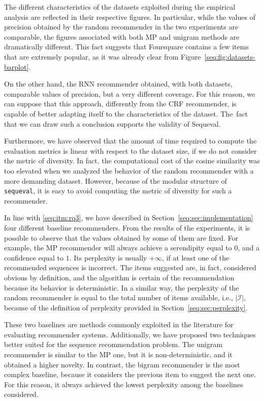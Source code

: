 The different characteristics of the datasets exploited during the empirical analysis are reflected in their respective figures. In particular, while the values of precision obtained by the random recommender in the two experiments are comparable, the figures associated with both MP and unigram methods are dramatically different. This fact suggests that Foursquare contains a few items that are extremely popular, as it was already clear from Figure~\ref{seq:fig:datasets-barplot}.

On the other hand, the RNN recommender obtained, with both datasets, comparable values of precision, but a very different coverage. For this reason, we can suppose that this approach, differently from the CRF recommender, is capable of better adapting itself to the characteristics of the dataset. The~fact that we can draw such {a }conclusion supports the validity of Sequeval.

Furthermore, we have observed that the amount of time required to compute the evaluation metrics is linear with respect to the dataset size, if we do not consider the metric of diversity. In fact, the computational cost of the cosine similarity was too elevated when we analyzed the behavior of the random recommender with a more demanding dataset. However, because of the modular structure of \texttt{sequeval}, it is easy to avoid computing the metric of diversity for such a recommender.

In line with \ref{seq:itm:rq3}, we have described in Section~\ref{seq:sec:implementation} four different baseline recommenders. From the results of the experiments, it is possible to observe that the values obtained by some of them are fixed. For example, the MP recommender will always achieve a serendipity equal to $0$, and a confidence equal to $1$. Its perplexity is usually $+\infty$, if at least one of the recommended sequences is incorrect. The items suggested are, in fact, considered obvious by definition, and the algorithm is certain of the recommendation because its behavior is deterministic. In a similar way, the perplexity of the random recommender is equal to the total number of items available, i.e., $|\mathcal{I}|$, because of the definition of perplexity provided in Section~\ref{seq:sec:perplexity}.

These two baselines are methods commonly exploited in the literature for evaluating recommender systems. Additionally, we have proposed two techniques better suited for the sequence recommendation problem. The unigram recommender is similar to the MP one, but it is non-deterministic, and it obtained a higher novelty. In contrast, the bigram recommender is the most complex baseline, because it considers the previous item to suggest the next one. For this reason, it always achieved the lowest perplexity among the baselines considered.


